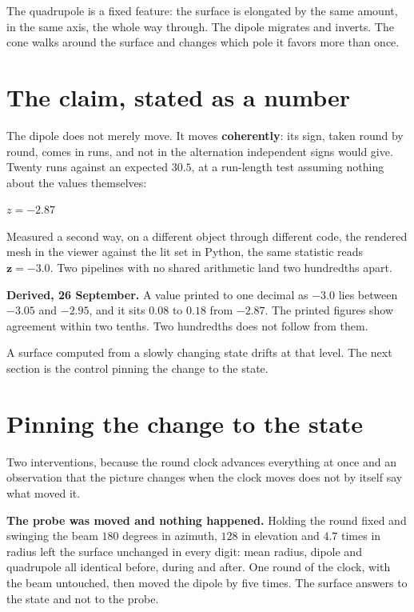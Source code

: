 The quadrupole is a fixed feature: the surface is elongated by the same amount, in the same axis, the whole way through. The dipole migrates and inverts. The cone walks around the surface and changes which pole it favors more than once.

\section{The claim, stated as a number}

The dipole does not merely move. It moves \textbf{coherently}: its sign, taken round by round, comes in runs, and not in the alternation independent signs would give. Twenty runs against an expected \(30.5\), at a run-length test assuming nothing about the values themselves:

\begin{center}
\(z = -2.87\)
\end{center}

Measured a second way, on a different object through different code, the rendered mesh in the viewer against the lit set in Python, the same statistic reads \(\mathbf{z = -3.0}\). Two pipelines with no shared arithmetic land two hundredths apart.

\textbf{Derived, 26 September.} A value printed to one decimal as \(-3.0\) lies between \(-3.05\) and \(-2.95\), and it sits \(0.08\) to \(0.18\) from \(-2.87\). The printed figures show agreement within two tenths. Two hundredths does not follow from them.

A surface computed from a slowly changing state drifts at that level. The next section is the control pinning the change to the state.

\section{Pinning the change to the state}

Two interventions, because the round clock advances everything at once and an observation that the picture changes when the clock moves does not by itself say what moved it.

\textbf{The probe was moved and nothing happened.} Holding the round fixed and swinging the beam \(180\) degrees in azimuth, \(128\) in elevation and \(4.7\) times in radius left the surface unchanged in every digit: mean radius, dipole and quadrupole all identical before, during and after. One round of the clock, with the beam untouched, then moved the dipole by five times. The surface answers to the state and not to the probe.


